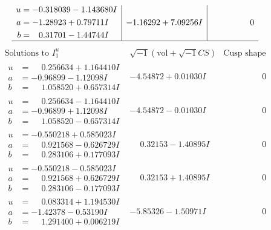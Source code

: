 \documentclass[1p]{elsarticle_modified}
\theoremstyle{definition}
\newcommand{\I}{\sqrt{-1}}
\begin{document}
$$\begin{array}{c|c|c}
\begin{aligned}
u &= -0.318039 - 1.143680 I \\
a &= -1.28923 + 0.79711 I \\
b &= \phantom{-}0.31701 - 1.44744 I\end{aligned}
 & -1.16292 + 7.09256 I & \phantom{-0.000000 } 0\\
 \hline 
 \end{array}$$\newpage$$\begin{array}{c|c|c}  
\text{Solutions to }I^u_{1}& \I (\text{vol} + \sqrt{-1}CS) & \text{Cusp shape}\\
 \hline 
\begin{aligned}
u &= \phantom{-}0.256634 + 1.164410 I \\
a &= -0.96899 - 1.12098 I \\
b &= \phantom{-}1.058520 + 0.657314 I\end{aligned}
 & -4.54872 + 0.01030 I & \phantom{-0.000000 } 0 \\ \hline\begin{aligned}
u &= \phantom{-}0.256634 - 1.164410 I \\
a &= -0.96899 + 1.12098 I \\
b &= \phantom{-}1.058520 - 0.657314 I\end{aligned}
 & -4.54872 - 0.01030 I & \phantom{-0.000000 } 0 \\ \hline\begin{aligned}
u &= -0.550218 + 0.585023 I \\
a &= \phantom{-}0.921568 - 0.626729 I \\
b &= \phantom{-}0.283106 + 0.177093 I\end{aligned}
 & \phantom{-}0.32153 - 1.40895 I & \phantom{-0.000000 } 0 \\ \hline\begin{aligned}
u &= -0.550218 - 0.585023 I \\
a &= \phantom{-}0.921568 + 0.626729 I \\
b &= \phantom{-}0.283106 - 0.177093 I\end{aligned}
 & \phantom{-}0.32153 + 1.40895 I & \phantom{-0.000000 } 0 \\ \hline\begin{aligned}
u &= \phantom{-}0.083314 + 1.194530 I \\
a &= -1.42378 - 0.53190 I \\
b &= \phantom{-}1.291400 + 0.006219 I\end{aligned}
 & -5.85326 - 1.50971 I & \phantom{-0.000000 } 0 \\ \hline\begin{aligned}

\end{aligned}
\end{array}$$
\end{document}
